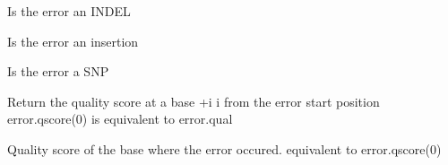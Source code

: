 \documentclass[letterpaper,10pt,english]{sphinxmanual}
\begin{document}
\begin{fulllineitems}
\begin{fulllineitems}
\label{index:proto_err.errorCount.error.isIndel}
Is the error an INDEL

\end{fulllineitems}


\begin{fulllineitems}
\label{index:proto_err.errorCount.error.isInsertion}
Is the error an insertion

\end{fulllineitems}


\begin{fulllineitems}
\label{index:proto_err.errorCount.error.isSnp}
Is the error a SNP

\end{fulllineitems}


\begin{fulllineitems}
\label{index:proto_err.errorCount.error.qscore}
Return the quality score at a base +i i from the error start position
error.qscore(0) is equivalent to error.qual

\end{fulllineitems}


\begin{fulllineitems}
\label{index:proto_err.errorCount.error.qual}
Quality score of the base where the error occured. 
equivalent to error.qscore(0)

\end{fulllineitems}


\end{fulllineitems}

\end{document}
